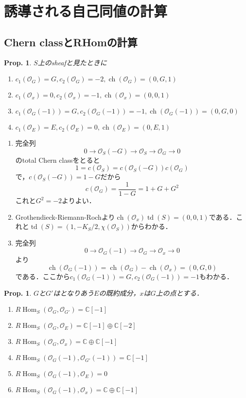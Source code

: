 \documentclass[uplatex,a4paper,11pt,dvipdfmx]{jsarticle}
\makeatletter
\theoremstyle{mystyle} %
\newtheorem{proposition}[theorem]{Prop.}
\renewenvironment{proof}[1][\proofname]{\par
 \pushQED{\qed}%
 \normalfont \topsep6\p@\@plus6\p@\relax
 \trivlist
 \item[\hskip\labelsep
 \itshape
 {\bf\underline{#1}}]\ignorespaces
}{%
 \popQED\endtrivlist\@endpefalse
}
\DeclareMathOperator{\Hom}{Hom}
\DeclareMathOperator{\ch}{ch}
\DeclareMathOperator{\td}{td}
\makeatother
\begin{document}
\section{誘導される自己同値の計算}
\subsection{Chern classとRHomの計算}
\begin{proposition}
	$S$上のsheafと見たときに
	\begin{enumerate}
		\item $c_1(\mathcal{O}_G) = G, c_2(\mathcal{O}_G) = -2, \ch(\mathcal{O}_G) = (0, G, 1)$

		\item $c_1(\mathcal{O}_x) = 0, c_2(\mathcal{O}_x) = -1, \ch(\mathcal{O}_x) = (0, 0, 1)$
		\item $c_1(\mathcal{O}_G(-1)) = G, c_2(\mathcal{O}_G(-1)) = -1, \ch(\mathcal{O}_G(-1)) = (0, G, 0)$
		\item $c_1(\mathcal{O}_E) = E, c_2(\mathcal{O}_E) = 0, \ch(\mathcal{O}_E) = (0, E, 1)$
	\end{enumerate}
\end{proposition}
\begin{proof}
	\begin{enumerate}
		\item 完全列$$0 \to \mathcal{O}_S(-G) \to \mathcal{O}_S \to \mathcal{O}_G \to 0$$のtotal Chern classをとると$$1 = c(\mathcal{O}_S) = c(\mathcal{O}_S(-G))c(\mathcal{O}_G)$$で，$c(\mathcal{O}_S(-G)) = 1-G$だから$$c(\mathcal{O}_G) = \frac{1}{1-G} = 1+G+G^2$$これと$G^2=-2$よりよい．

		\item Grothendieck-Riemann-Rochより$\ch(\mathcal{O}_x)\td(S) = (0, 0, 1)$である．これと$\td(S) = (1, -K_S/2, \chi(\mathcal{O}_S))$からわかる．
		\item 完全列$$0 \to \mathcal{O}_G(-1) \to \mathcal{O}_G \to \mathcal{O}_x \to 0$$より$$\ch( \mathcal{O}_G(-1)) = \ch(\mathcal{O}_G) - \ch(\mathcal{O}_x) = (0, G, 0)$$である．ここから$c_1(\mathcal{O}_G(-1)) = G, c_2(\mathcal{O}_G(-1)) = -1$もわかる．
	\end{enumerate}
\end{proof}
\begin{proposition}
	$G$と$G'$はとなりあう$E$の既約成分，$x$は$G$上の点とする．
	\begin{enumerate}
		\item $R\Hom_S(\mathcal{O}_G, \mathcal{O}_{G'}) = \mathbb{C}[-1]$
		\item $R\Hom_S(\mathcal{O}_G, \mathcal{O}_E) = \mathbb{C}[-1]\oplus\mathbb{C}[-2]$
		\item $R\Hom_S(\mathcal{O}_G, \mathcal{O}_x) = \mathbb{C}\oplus\mathbb{C}[-1]$
		\item $R\Hom_S(\mathcal{O}_G(-1), \mathcal{O}_{G'}(-1)) = \mathbb{C}[-1]$
		\item $R\Hom_S(\mathcal{O}_G(-1), \mathcal{O}_E) = 0$
		\item $R\Hom_S(\mathcal{O}_G(-1), \mathcal{O}_x) = \mathbb{C}\oplus\mathbb{C}[-1]$
	\end{enumerate}
\end{proposition}
\end{document}
